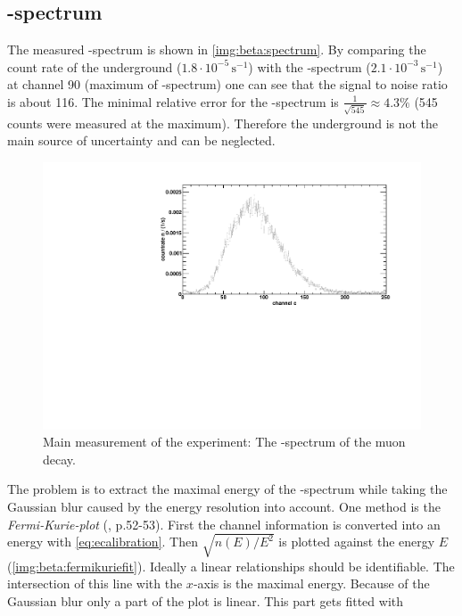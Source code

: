 \subsection{\textbeta-spectrum}
The measured \textbeta-spectrum is shown in \autoref{img:beta:spectrum}. By comparing the count rate of the underground ($1.8\cdot10^{-5}\,\text{s}^{-1}$) 
with the \textbeta-spectrum ($2.1\cdot10^{-3}\,\text{s}^{-1}$)
at channel 90 (maximum of \textbeta-spectrum) one can see that the signal to noise ratio is about 116. The minimal relative error for the 
\textbeta-spectrum is $\frac{1}{\sqrt{545}} \approx 4.3\%$ (545 counts were measured at the maximum). Therefore the underground is not the main 
source of uncertainty and can be neglected.
\begin{figure}[H]
\begin{center}
  \includegraphics[width=\textwidth]{../img/betaspectrum.pdf}
  \caption{Main measurement of the experiment: The \textbeta-spectrum of the muon decay.}
  \label{img:beta:spectrum}
\end{center}
\end{figure}
The problem is to extract the maximal energy of the \textbeta-spectrum while taking the Gaussian blur caused by the energy resolution into account. One method is the 
\emph{Fermi-Kurie-plot} (\cite{dem4}, p.52-53).
First the channel information is converted into an energy with \autoref{eq:ecalibration}. Then $\sqrt{n(E)/E^2}$ is plotted against 
the energy $E$ (\autoref{img:beta:fermikuriefit}). Ideally a linear relationships should be identifiable. The intersection of this line with 
the $x$-axis is the maximal energy. Because of the Gaussian blur only a part of the plot is linear. This part gets fitted with
